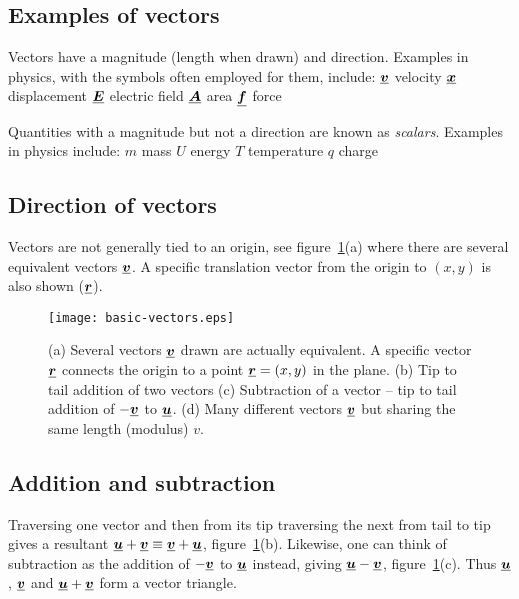 



\addtolength{\topmargin}{-0.7 cm}
\setlength{\columnsep}{22pt}

\subsection*{Examples of vectors}
Vectors have a magnitude (length when drawn) and direction.  Examples in physics, with the symbols often employed for them, include:\nl
$\mathit{\underline{\boldsymbol{v}}}$ velocity \nl
$\mathit{\underline{\boldsymbol{x}}}$ displacement \nl
$\mathit{\underline{\boldsymbol{E}}}$ electric field \nl
$\mathit{\underline{\boldsymbol{A}}}$ area \nl
$\mathit{\underline{\boldsymbol{f}}}$ force \nl

\noindent Quantities with a magnitude but not a direction are known as \emph{scalars}.  Examples in physics include: \nl
$m$ mass \nl
$U$ energy \nl
$T$ temperature \nl
$q$ charge \nl

\subsection*{Direction of vectors}
Vectors are not generally tied to an origin, see
figure~\ref{fig:basic-vectors}(a) where there are several equivalent vectors $\mathit{\underline{\boldsymbol{v}}}$. A specific translation vector from the origin to $(x,y)$ is also shown ($\mathit{\underline{\boldsymbol{r}}}$).
\begin{figure}[h!]
\centering
\texttt{[image: basic-vectors.eps]}
\caption{(a) Several vectors $\mathit{\underline{\boldsymbol{v}}}$ drawn are actually equivalent.  A specific vector $\mathit{\underline{\boldsymbol{r}}}$ connects the origin to a point $\mathit{\underline{\boldsymbol{r}}} = (x,y)$ in the plane.  (b) Tip to tail addition of two vectors (c) Subtraction of a vector -- tip to tail addition of $-\mathit{\underline{\boldsymbol{v}}}$ to $\mathit{\underline{\boldsymbol{u}}}$.  (d) Many different vectors $\mathit{\underline{\boldsymbol{v}}}$ but sharing the same length (modulus) $v$. }\label{fig:basic-vectors}
\end{figure}
\subsection*{Addition and subtraction}
Traversing one vector and then from its tip traversing the next from tail to tip gives a resultant $\mathit{\underline{\boldsymbol{u}}} + \mathit{\underline{\boldsymbol{v}}} \equiv \mathit{\underline{\boldsymbol{v}}} + \mathit{\underline{\boldsymbol{u}}}$, figure~\ref{fig:basic-vectors}(b).  Likewise, one can think of subtraction as the addition of $-\mathit{\underline{\boldsymbol{v}}}$ to $\mathit{\underline{\boldsymbol{u}}}$ instead, giving $\mathit{\underline{\boldsymbol{u}}} - \mathit{\underline{\boldsymbol{v}}}$, figure~\ref{fig:basic-vectors}(c).  Thus $\mathit{\underline{\boldsymbol{u}}}$, $\mathit{\underline{\boldsymbol{v}}}$ and $\mathit{\underline{\boldsymbol{u}}} + \mathit{\underline{\boldsymbol{v}}}$ form a vector triangle.

